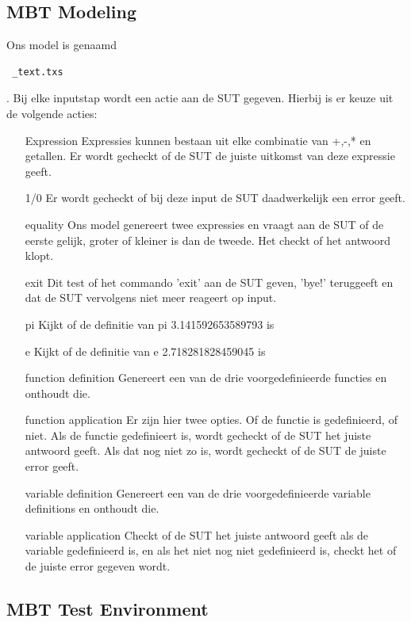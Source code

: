 \documentclass[11pt,a4paper]{article}
\begin{document}
\subsection{MBT Modeling}
Ons model is genaamd \begin{verbatim} _text.txs \end{verbatim}. Bij elke inputstap wordt een actie aan de SUT gegeven. Hierbij is er keuze uit de volgende acties:
\begin{itemize}
	\item[Expression] Expressies kunnen bestaan uit elke combinatie van +,-,* en getallen. Er wordt gecheckt of de SUT de juiste uitkomst van deze expressie geeft.
	\item[1/0] Er wordt gecheckt of bij deze input de SUT daadwerkelijk een error geeft.
	\item[equality] Ons model genereert twee expressies en vraagt aan de SUT of de eerste gelijk, groter of kleiner is dan de tweede. Het checkt of het antwoord klopt.
	\item[exit] Dit test of het commando 'exit' aan de SUT geven, 'bye!' teruggeeft en dat de SUT vervolgens niet meer reageert op input.
	\item[pi] Kijkt of de definitie van pi 3.141592653589793 is
	\item[e] Kijkt of de definitie van e 2.718281828459045 is
	\item[function definition] Genereert een van de drie voorgedefinieerde functies en onthoudt die.
	\item[function application] Er zijn hier twee opties. Of de functie is gedefinieerd, of niet. Als de functie gedefinieert is, wordt gecheckt of de SUT het juiste antwoord geeft. Als dat nog niet zo is, wordt gecheckt of de SUT de juiste error geeft.
	\item[variable definition] Genereert een van de drie voorgedefinieerde variable definitions en onthoudt die.
	\item[variable application] Checkt of de SUT het juiste antwoord geeft als de variable gedefinieerd is, en als het niet nog niet gedefinieerd is, checkt het of de juiste error gegeven wordt.
\end{itemize}

\subsection{MBT Test Environment}
\end{document}

